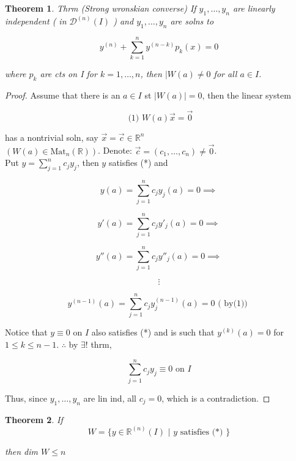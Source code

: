 \documentclass{article}
\newtheorem*{theorem}{Theorem}
\theoremstyle{definition}
\begin{document}
\begin{theorem}
  Thrm (Strong wronskian converse) If \( y_1, \dots , y_n \) are linearly
  independent ( in \( \mathscr{D}^{(n)} (I) \) ) and \( y_1, \dots , y_n
  \) are solns to 


  \[ y^{(n)} + \sum_{k=1}^n y^{(n-k)} p_k(x) = 0 \]

  where \( p_k \) are cts on I for \( k=1, \dots , n \), then \( |W(a)
  \neq 0  \) for all \( a \in I \). 
\end{theorem}

\begin{proof}
  Assume that there is an \( a \in I \) st \( |W(a)| = 0 \), then
  the linear system 

  \[ \text{ (1) } W(a) \vec{x} = \vec{0} \]

  has a nontrivial soln, say \( \vec{x} = \vec{c} \in \mathbb{R}^n \)\\
  \( (W(a) \in \text{Mat}_n( \mathbb{R})) \). Denote: \( \vec{c} = (c_1,
  \dots , c_n) \neq \vec{0} \). \\[5mm]

  Put \( y = \sum_{j=1}^n c_j y_j \), then \( y \) satisfies (*) and %

  \[  y(a) = \sum_{j=1}^n c_j y_j(a) = 0  \implies\]

  \[ y'(a) = \sum_{j=1}^n c_j y'_j(a) = 0 \implies\]

  \[  y''(a) = \sum_{j=1}^n c_j y''_j(a) = 0  \implies\]

  \[ \vdots \]

  \[  y^{(n-1)}(a) = \sum_{j=1}^n c_j y^{(n-1)}_j(a) = 0 \text{ ( by(1)) } \]

  Notice that \( y \equiv 0 \) on \( I  \) also satisfies (*) and is such
  that \( y^{(k)}(a) = 0 \) for \( 1 \leq k \leq n-1 \). \( \therefore \)
  by \( \exists \)! thrm, 

  \[ \sum_{j=1}^n c_j y_j \equiv 0 \text{ on } I \]

  Thus, since \( y_1, \dots , y_n \) are lin ind, all \( c_j = 0 \), which
  is a contradiction.  
\end{proof}

\begin{theorem}
  If
  \[ W = \{ y \in \mathbb{R}^{(n)}(I) \text{ | } y \text{ satisfies (*) }  \}
  \]

  then dim \( W \leq n  \)
\end{theorem}
\end{document}
